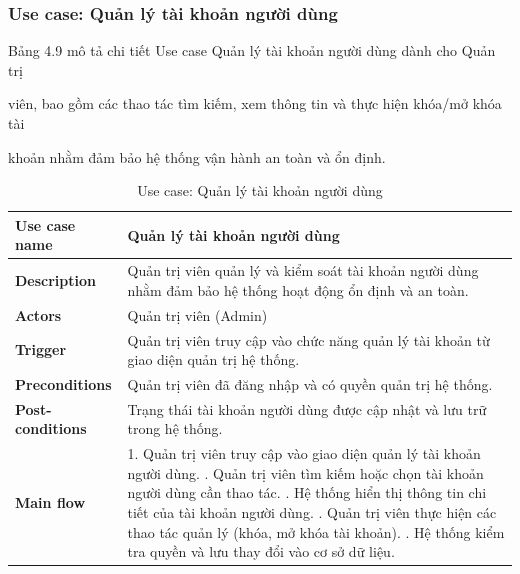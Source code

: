 
\subsubsection{Use case: Quản lý tài khoản người dùng}

Bảng 4.9 mô tả chi tiết Use case Quản lý tài khoản người dùng dành cho Quản trị

viên, bao gồm các thao tác tìm kiếm, xem thông tin và thực hiện khóa/mở khóa tài

khoản nhằm đảm bảo hệ thống vận hành an toàn và ổn định.


\begingroup
\renewcommand{\arraystretch}{1.25}
\begin{longtable}{|p{4cm}|p{10cm}|}
\caption{Use case: Quản lý tài khoản người dùng} \\
\endfirsthead

\endhead

\endfoot

\endlastfoot

\hline

\textbf{Use case name} &
Quản lý tài khoản người dùng \\
\hline

\textbf{Description} &
Quản trị viên quản lý và kiểm soát tài khoản người dùng nhằm đảm bảo hệ thống hoạt động ổn định và an toàn. \\
\hline

\textbf{Actors} &
Quản trị viên (Admin) \\
\hline

\textbf{Trigger} &
Quản trị viên truy cập vào chức năng quản lý tài khoản từ giao diện quản trị hệ thống. \\
\hline

\textbf{Preconditions} &
Quản trị viên đã đăng nhập và có quyền quản trị hệ thống. \\
\hline

\textbf{Post-conditions} &
Trạng thái tài khoản người dùng được cập nhật và lưu trữ trong hệ thống. \\
\hline

\textbf{Main flow} &
1. Quản trị viên truy cập vào giao diện quản lý tài khoản người dùng. \newline 2. Quản trị viên tìm kiếm hoặc chọn tài khoản người dùng cần thao tác. \newline 3. Hệ thống hiển thị thông tin chi tiết của tài khoản người dùng. \newline 4. Quản trị viên thực hiện các thao tác quản lý (khóa, mở khóa tài khoản). \newline 5. Hệ thống kiểm tra quyền và lưu thay đổi vào cơ sở dữ liệu. \\
\hline


\end{longtable}
